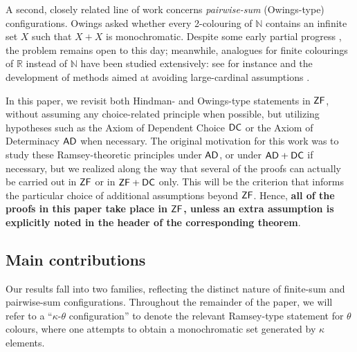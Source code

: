 \documentclass{amsart}
\theoremstyle{definition}
\newcommand{\zf}{\mathnormal{\mathsf{ZF}}}
\newcommand{\dc}{\mathnormal{\mathsf{DC}}}
\newcommand{\ad}{\mathnormal{\mathsf{AD}}}
\theoremstyle{remark}
\numberwithin{equation}{section}
\begin{document}
A second, closely related line of work concerns \emph{pairwise-sum} (Owings-type) configurations. 
Owings \cite{Owings1974} asked whether every 2-colouring of $\mathbb{N}$ contains an infinite set $X$ such that $X+X$ is monochromatic. Despite some early partial progress \cite{Hindman1979}, the problem remains open to this day; meanwhile, analogues for finite colourings of $\mathbb{R}$ instead of $\mathbb{N}$ have been studied extensively: see for instance \cite{HindmanLeaderStrauss2017, KomjathLeaderRussellShelahSoukupVidnyanszky2019, LeaderRussell2020} and the development of methods aimed at avoiding large-cardinal assumptions \cite{Zhang2020}. 

In this paper, we revisit both Hindman- and Owings-type statements in $\zf$, without assuming any choice-related principle when possible, but utilizing hypotheses such as the Axiom of Dependent Choice $\dc$ or the Axiom of Determinacy $\ad$ when necessary. The original motivation for this work was to study these Ramsey-theoretic principles under $\ad$, or under $\ad+\dc$ if necessary, but we realized along the way that several of the proofs can actually be carried out in $\zf$ or in $\zf+\dc$ only. This will be the criterion that informs the particular choice of additional assumptions beyond $\zf$. Hence, {\bf all of the proofs in this paper take place in $\zf$, unless an extra assumption is explicitly noted in the header of the corresponding theorem}.

\subsection*{Main contributions}\label{sec:main-contributions}
Our results fall into two families, reflecting the distinct nature of finite-sum and pairwise-sum configurations. Throughout the remainder of the paper, we will refer to a ``$\kappa$-$\theta$ configuration'' to denote the relevant Ramsey-type statement for $\theta$ colours, where one attempts to obtain a monochromatic set generated by $\kappa$ elements.
\end{document}
